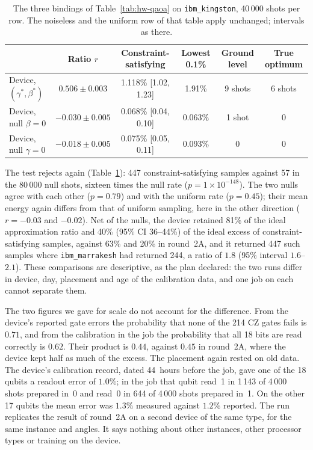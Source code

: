 \documentclass[11pt,a4paper]{article}
\begin{document}
\begin{table}[H]
\centering\footnotesize\setlength{\tabcolsep}{5pt}
\begin{tabular}{lccccc}
\toprule
 & Ratio $r$ & Constraint-satisfying & Lowest 0.1\% & Ground level & True optimum \\
\midrule
Device, $(\gamma^\ast,\beta^\ast)$ & $0.506 \pm 0.003$ & 1.118\% [1.02, 1.23] & 1.91\% & 9 shots & 6 shots \\
Device, null $\beta = 0$ & $-0.030 \pm 0.005$ & 0.068\% [0.04, 0.10] & 0.063\% & 1 shot & 0 \\
Device, null $\gamma = 0$ & $-0.018 \pm 0.005$ & 0.075\% [0.05, 0.11] & 0.093\% & 0 & 0 \\
\bottomrule
\end{tabular}
\caption{The three bindings of Table~\ref{tab:hw-qaoa} on
\texttt{ibm\_kingston}, 40\,000 shots per row. The noiseless and the uniform
row of that table apply unchanged; intervals as there.}
\label{tab:hw-qaoa-kingston}
\end{table}

The test rejects again (Table~\ref{tab:hw-qaoa-kingston}): 447
constraint-satisfying samples against 57 in the 80\,000 null shots, sixteen
times the null rate ($p = 1\times10^{-148}$). The two nulls agree with each
other ($p = 0.79$) and with the uniform rate ($p = 0.45$); their mean energy again
differs from that of uniform sampling, here in the other direction
($r = -0.03$ and $-0.02$). Net of the nulls, the device retained 81\% of the
ideal approximation ratio and 40\% (95\% CI 36--44\%) of the ideal excess of
constraint-satisfying samples, against 63\% and 20\% in round~2A, and it
returned 447 such samples where \texttt{ibm\_marrakesh} had returned 244, a
ratio of $1.8$ (95\% interval $1.6$--$2.1$). These comparisons are
descriptive, as the plan declared: the two runs differ in device, day,
placement and age of the calibration data, and one job on each cannot
separate them.

The two figures we gave for scale do not account for the difference. From
the device's reported gate errors the probability that none of the 214 CZ
gates fails is $0.71$, and from the calibration in the job the probability
that all 18 bits are read correctly is $0.62$. Their product is $0.44$,
against $0.45$ in round~2A, where the device kept half as much of the
excess. The placement again rested on old data. The device's calibration
record, dated 44~hours before the job, gave one of the 18 qubits a readout
error of $1.0\%$; in the job that qubit read~1 in 1\,143 of 4\,000 shots
prepared in~0 and read~0 in 644 of 4\,000 shots prepared in~1. On the other
17 qubits the mean error was $1.3\%$ measured against $1.2\%$ reported. The
run replicates the result of round~2A on a second device of the same type,
for the same instance and angles. It says nothing about other instances,
other processor types or training on the device.
\end{document}
